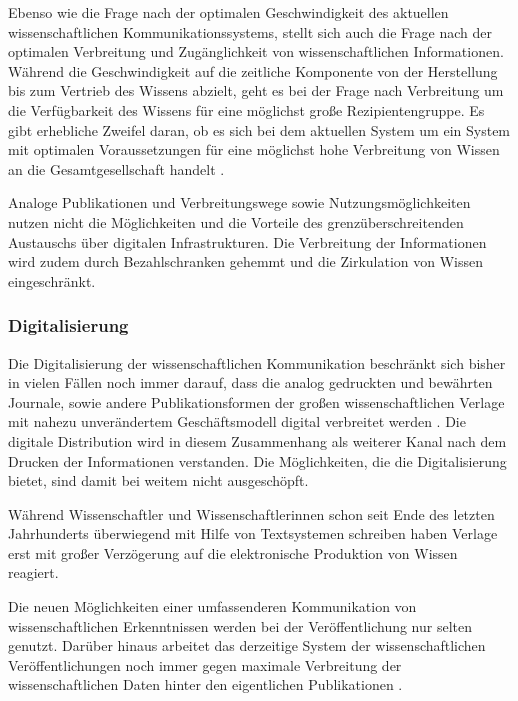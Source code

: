 Ebenso wie die Frage nach der optimalen Geschwindigkeit des aktuellen wissenschaftlichen Kommunikationssystems, stellt sich auch die Frage nach der optimalen Verbreitung und Zugänglichkeit von wissenschaftlichen Informationen. Während die Geschwindigkeit auf die zeitliche Komponente von der Herstellung bis zum Vertrieb des Wissens abzielt, geht es bei der Frage nach Verbreitung um die Verfügbarkeit des Wissens für eine möglichst große Rezipientengruppe. Es gibt erhebliche Zweifel daran, ob es sich bei dem aktuellen System um ein System mit optimalen Voraussetzungen für eine möglichst hohe Verbreitung von Wissen an die Gesamtgesellschaft handelt \cite{suchen}.

Analoge Publikationen und Verbreitungswege sowie Nutzungsmöglichkeiten nutzen nicht die Möglichkeiten und die Vorteile des grenzüberschreitenden Austauschs über digitalen Infrastrukturen. Die Verbreitung der Informationen wird zudem durch Bezahlschranken gehemmt und die Zirkulation von Wissen eingeschränkt.

\subsubsection{Digitalisierung}

Die Digitalisierung der wissenschaftlichen Kommunikation beschränkt sich bisher in vielen Fällen noch immer darauf, dass die analog gedruckten und bewährten Journale, sowie andere Publikationsformen der großen wissenschaftlichen Verlage mit nahezu unverändertem Geschäftsmodell digital verbreitet werden \cite{Hanekop_2014}. Die digitale Distribution wird in diesem Zusammenhang als weiterer Kanal nach dem Drucken der Informationen verstanden. Die Möglichkeiten, die die Digitalisierung bietet, sind damit bei weitem nicht ausgeschöpft.

Während Wissenschaftler und Wissenschaftlerinnen schon seit Ende des letzten Jahrhunderts überwiegend mit Hilfe von Textsystemen schreiben \cite{Brueggemann-Klein_1995} \cite{bjork_2004_open} haben Verlage erst mit großer Verzögerung auf die elektronische Produktion von Wissen reagiert.

Die neuen Möglichkeiten einer umfassenderen Kommunikation von wissenschaftlichen Erkenntnissen werden bei der Veröffentlichung nur selten genutzt. Darüber hinaus arbeitet das derzeitige System der wissenschaftlichen Veröffentlichungen noch immer gegen maximale Verbreitung der wissenschaftlichen Daten hinter den eigentlichen Publikationen \cite{Molloy_2011}.

